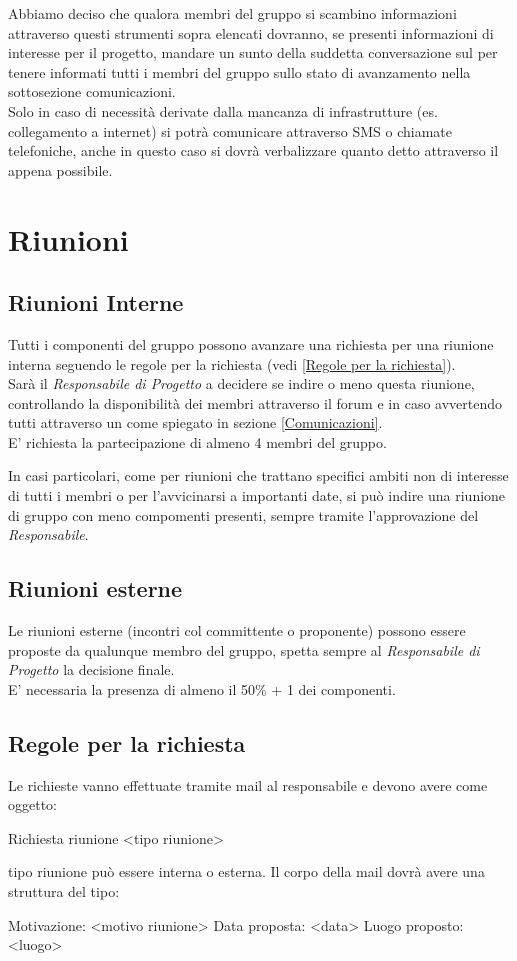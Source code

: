 \documentclass{scalatekids-article}
\begin{document}
Abbiamo deciso che qualora membri del gruppo si scambino informazioni attraverso
questi strumenti sopra elencati dovranno, se presenti informazioni di interesse
per il progetto, mandare un sunto della suddetta conversazione sul 
per tenere informati tutti i membri del gruppo sullo stato di avanzamento nella
sottosezione comunicazioni.\\ Solo in caso di necessità derivate dalla mancanza
di infrastrutture (es. collegamento a internet) si potrà comunicare attraverso
SMS o chiamate telefoniche, anche in questo caso si dovrà verbalizzare quanto
detto attraverso il  appena possibile.

\section{Riunioni}

\subsection{Riunioni Interne}
Tutti i componenti del gruppo possono avanzare una richiesta per una riunione
interna seguendo le regole per la richiesta (vedi \ref{Regole per la
  richiesta}).\\ Sarà il \textit{Responsabile di Progetto} a decidere se indire
o meno questa riunione, controllando la disponibilità dei membri attraverso il
forum e in caso avvertendo tutti attraverso un  come spiegato in
sezione \ref{Comunicazioni}.\\ E' richiesta la partecipazione di almeno 4 membri
del gruppo.

In casi particolari, come per riunioni che trattano specifici ambiti non di
interesse di tutti i membri o per l'avvicinarsi a importanti date, si può indire
una riunione di gruppo con meno compomenti presenti, sempre tramite
l'approvazione del \textit{Responsabile}.

\subsection{Riunioni esterne}
Le riunioni esterne (incontri col committente o proponente) possono essere
proposte da qualunque membro del gruppo, spetta sempre al \textit{Responsabile
  di Progetto} la decisione finale.\\ E' necessaria la presenza di almeno il
50\% + 1 dei componenti.

\subsection{Regole per la richiesta}
Le richieste vanno effettuate tramite mail al responsabile e devono avere come oggetto:
\begin{center}
  Richiesta riunione <tipo riunione>
\end{center}
tipo riunione può essere interna o esterna.
Il corpo della mail dovrà avere una struttura del tipo:
\begin{center}
  Motivazione: <motivo riunione>
  Data proposta: <data>
  Luogo proposto: <luogo>
\end{center}
\end{document}
